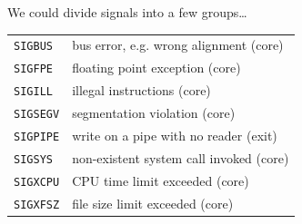 

\begin{slide}

We could divide signals into a few groups\dots


\begin{tabular}{ll}
\texttt{SIGBUS} & bus error, e.g. wrong alignment (core) \\
\texttt{SIGFPE} & floating point exception (core) \\
\texttt{SIGILL} & illegal instructions (core) \\
\texttt{SIGSEGV} & segmentation violation (core) \\
\texttt{SIGPIPE} & write on a pipe with no reader (exit) \\
\texttt{SIGSYS} & non-existent system call invoked (core) \\
\texttt{SIGXCPU} & CPU time limit exceeded (core) \\
\texttt{SIGXFSZ} & file size limit exceeded (core)\\
\end{tabular}
\end{slide}

